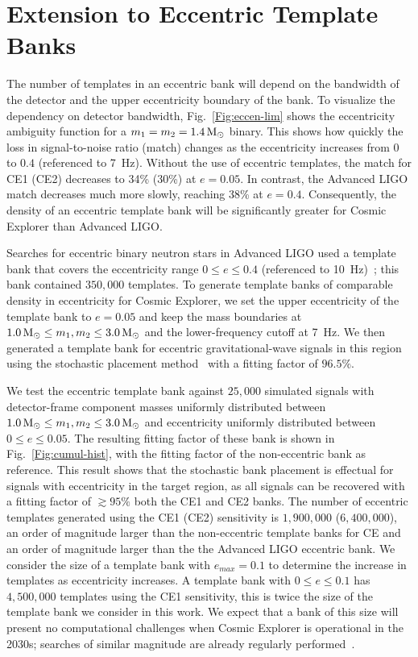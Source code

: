 \section{\label{s:3G-ecc} Extension to Eccentric Template Banks}

The number of templates in an eccentric bank will depend on the bandwidth of the detector and the upper eccentricity boundary of the bank. To visualize the dependency on detector bandwidth, Fig.~\ref{Fig:eccen-lim} shows the eccentricity ambiguity function for a $m_1 = m_2 = 1.4\,\mathrm{M}_{\odot}$ binary. This shows how quickly the loss in signal-to-noise ratio (match) changes as the eccentricity increases from $0$ to $0.4$ (referenced to 7~Hz). Without the use of eccentric templates, the match for CE1 (CE2) decreases to 34\% (30\%) at $e = 0.05$. In contrast, the Advanced LIGO match decreases much more slowly, reaching 38\% at $e = 0.4$. Consequently, the density of an eccentric template bank will be significantly greater for Cosmic Explorer than Advanced LIGO.

Searches for eccentric binary neutron stars in Advanced LIGO used a template bank that covers the eccentricity range $0 \le e \le 0.4$ (referenced to 10~Hz)~\cite{Nitz:2019spj}; this bank contained $350,000$ templates. To generate template banks of comparable density in eccentricity for Cosmic Explorer, we set the upper eccentricity of the template bank to $e=0.05$ and keep the mass boundaries at $1.0\,\mathrm{M}_{\odot} \leq m_1,m_2 \leq 3.0\,\mathrm{M}_{\odot}$ and the lower-frequency cutoff at 7~Hz. We then generated a template bank for eccentric gravitational-wave signals in this region using the stochastic placement method~\cite{Harry:2009ea,Manca:2009xw} with a fitting factor of $96.5\%$. 

We test the eccentric template bank against $25,000$ simulated signals with detector-frame component masses uniformly distributed between $1.0\,\mathrm{M}_{\odot} \leq m_1,m_2 \leq 3.0\,\mathrm{M}_{\odot}$ and eccentricity uniformly distributed between $0 \le e \le 0.05$. The resulting fitting factor of these bank is shown in Fig.~\ref{Fig:cumul-hist}, with the fitting factor of the non-eccentric bank as reference. This result shows that the stochastic bank placement is effectual for signals with eccentricity in the target region, as all signals can be recovered with a fitting factor of $\gtrsim 95\%$ both the CE1 and CE2 banks. The number of eccentric templates generated using the CE1 (CE2) sensitivity is $1,900,000$ ($6,400,000$), an order of magnitude larger than the non-eccentric template banks for CE and an order of magnitude larger than the the Advanced LIGO eccentric bank. We consider the size of a template bank with $e_{max} = 0.1$ to determine the increase in templates as eccentricity increases. A template bank with $0 \le e \le 0.1$ has $4,500,000$ templates using the CE1 sensitivity, this is twice the size of the template bank we consider in this work. We expect that a bank of this size will present no computational challenges when Cosmic Explorer is operational in the 2030s; searches of similar magnitude are already regularly performed~\cite{Nitz:2020bdb, Nitz:2021mzz}.  

